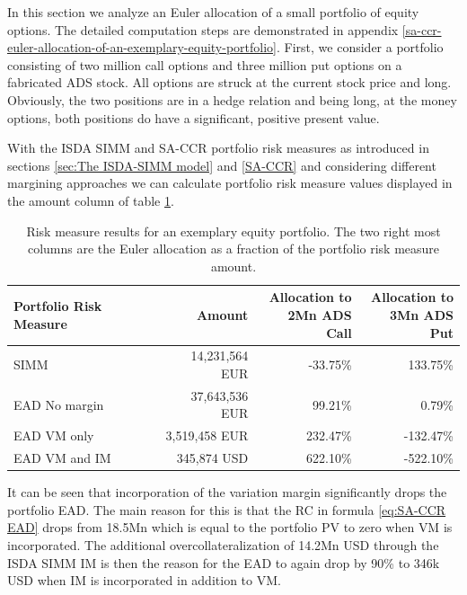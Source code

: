 \documentclass[../Thesis_AHoecherl.tex]{subfiles}
\begin{document}
    In this section we analyze an Euler allocation of a small portfolio of equity options. The detailed computation steps are demonstrated in appendix \ref{sa-ccr-euler-allocation-of-an-exemplary-equity-portfolio}. 
    First, we consider a portfolio consisting of two million call options and three million put options on a fabricated ADS stock. All options are struck at the current stock price and long. Obviously, the two positions are in a hedge relation and being long, at the money options, both positions do have a significant, positive present value. 
    
    With the \gls{ISDA SIMM} and \gls{SA-CCR} portfolio risk measures as introduced in sections \ref{sec:The ISDA-SIMM model} and \ref{SA-CCR} and considering different margining approaches we can calculate portfolio risk measure values displayed in the amount column of table \ref{tab:2TradeEquityResults}.
    \begin{table}[htbp]
        \centering
        \begin{tabular}{l||r|r|r}
            Portfolio Risk Measure & Amount & \makecell{Allocation to \\ 2Mn ADS Call} & \makecell{Allocation to \\ 3Mn ADS Put} \\
                \toprule
        SIMM  & 14,231,564 EUR & -33.75\% & 133.75\%  \\
        \gls{EAD} No margin & 37,643,536 EUR & 99.21\% & 0.79\%  \\
        \gls{EAD} \gls{VM} only & 3,519,458 EUR & 232.47\% & -132.47\%  \\
        \gls{EAD} \gls{VM} and \gls{IM} & 345,874 USD  & 622.10\% & -522.10\% \\
        \end{tabular}%
        \caption{Risk measure results for an exemplary equity portfolio. The two right most columns are the Euler allocation as a fraction of the portfolio risk measure amount.}
        \label{tab:2TradeEquityResults}%
    \end{table}%
    It can be seen that incorporation of the variation margin significantly drops the portfolio EAD. The main reason for this is that the RC in formula \ref{eq:SA-CCR EAD} drops from 18.5Mn which is equal to the portfolio \gls{PV} to zero when \gls{VM} is incorporated.
    The additional overcollateralization of 14.2Mn USD through the \gls{ISDA SIMM} \gls{IM} is then the reason for the \gls{EAD} to again drop by 90\% to 346k USD when \gls{IM} is incorporated in addition to \gls{VM}.
\end{document}
